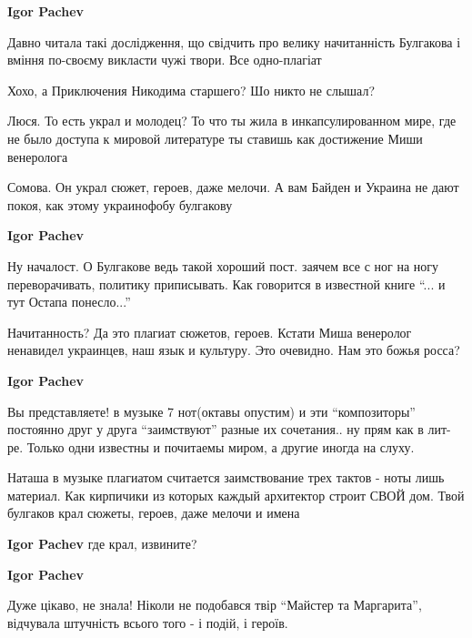 \begin{itemize}
\begin{itemize}
\textbf{Igor Pachev} 

Давно читала такі дослідження, що свідчить про велику начитанність Булгакова і
вміння по-своєму викласти чужі твори. Все одно-плагіат


Хохо, а Приключения Никодима старшего? Шо никто не слышал?


Люся. То есть украл и молодец? То что ты жила в инкапсулированном мире, где не
было доступа к мировой литературе ты ставишь как достижение Миши венеролога



Сомова. Он украл сюжет, героев, даже мелочи. А вам Байден и Украина не дают
покоя, как этому украинофобу булгакову

\begin{itemize} %
\textbf{Igor Pachev} 

Ну началост. О Булгакове ведь такой хороший пост. заячем все с ног на ногу
переворачивать, политику приписывать. Как говорится в известной книге \enquote{... и
тут Остапа понесло...}

\end{itemize} %


Начитанность? Да это плагиат сюжетов, героев. Кстати Миша венеролог ненавидел
украинцев, наш язык и культуру. Это очевидно. Нам это божья росса?


\textbf{Igor Pachev} 

Вы представляете! в музыке 7 нот(октавы опустим) и эти \enquote{композиторы} постоянно
друг у друга \enquote{заимствуют} разные их сочетания.. ну прям как в лит-ре. Только
одни известны и почитаемы миром, а другие иногда на слуху.


Наташа в музыке плагиатом считается заимствование трех тактов - ноты лишь
материал. Как кирпичики из которых каждый архитектор строит СВОЙ дом. Твой
булгаков крал сюжеты, героев, даже мелочи и имена

\textbf{Igor Pachev} где крал, извините?

\textbf{Igor Pachev} 

Дуже цікаво, не знала! Ніколи не подобався твір \enquote{Майстер та Маргарита},
відчувала штучність всього того - і подій, і героїв.



\end{itemize}
\end{itemize}
